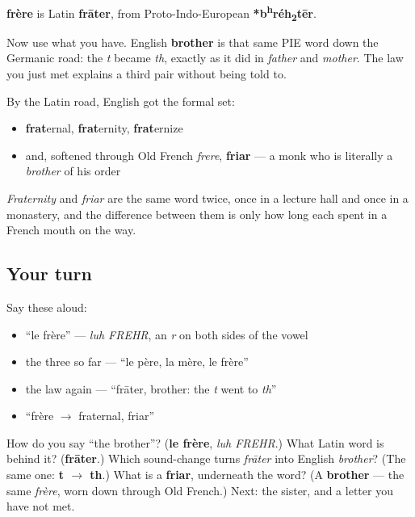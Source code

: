 \begin{cousinweb}
\textbf{frère} is Latin \textbf{frāter}, from Proto-Indo-European \textbf{*b\textsuperscript{h}réh\textsubscript{2}tēr}.

Now use what you have. English \textbf{brother} is that same PIE word down the Germanic road: the \emph{t} became \emph{th}, exactly as it did in \emph{father} and \emph{mother}. The law you just met explains a third pair without being told to.

By the Latin road, English got the formal set:

\begin{itemize}
\raggedright
  \item \textbf{frat}ernal, \textbf{frat}ernity, \textbf{frat}ernize
  \item and, softened through Old French \emph{frere}, \textbf{friar} — a monk who is literally a \emph{brother} of his order
\end{itemize}

\emph{Fraternity} and \emph{friar} are the same word twice, once in a lecture hall and once in a monastery, and the difference between them is only how long each spent in a French mouth on the way.
\end{cousinweb}

\subsection*{Your turn}
Say these aloud:

\begin{itemize}
\raggedright
  \item \textquotedblleft{}le frère\textquotedblright{} — \emph{luh FREHR}, an \emph{r} on both sides of the vowel
  \item the three so far — \textquotedblleft{}le père, la mère, le frère\textquotedblright{}
  \item the law again — \textquotedblleft{}frāter, brother: the \emph{t} went to \emph{th}\textquotedblright{}
  \item \textquotedblleft{}frère $\to$ fraternal, friar\textquotedblright{}
\end{itemize}

\begin{tcolorbox}[breakable,colback=teal!4,colframe=teal!35!black,title={Before you move on}]
How do you say \textquotedblleft{}the brother\textquotedblright{}? (\textbf{le frère}, \emph{luh FREHR}.) What Latin word is behind it? (\textbf{frāter}.) Which sound-change turns \emph{frāter} into English \emph{brother}? (The same one: \textbf{t $\to$ th}.) What is a \textbf{friar}, underneath the word? (A \textbf{brother} — the same \emph{frère}, worn down through Old French.) Next: the sister, and a letter you have not met.
\end{tcolorbox}
